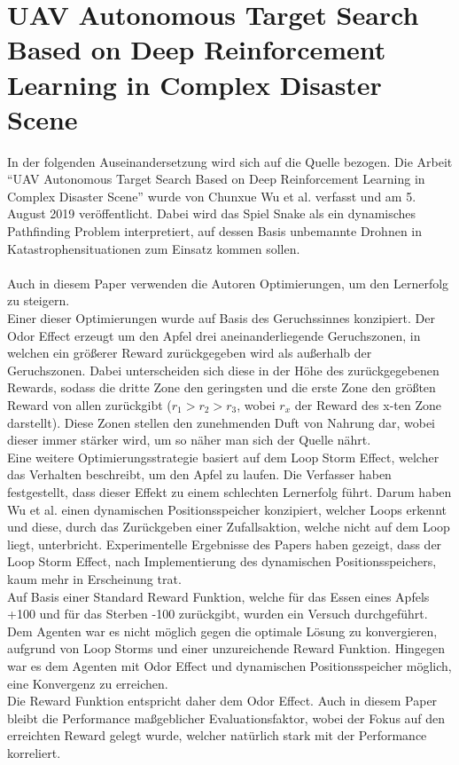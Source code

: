 \section{UAV Autonomous Target Search Based on Deep Reinforcement Learning in Complex Disaster Scene} \label{sec:Verwandte_Arbeiten_Paper_2}
In der folgenden Auseinandersetzung wird sich auf die Quelle \cite{UAV} bezogen.
Die Arbeit "`UAV Autonomous Target Search Based on Deep Reinforcement Learning in Complex Disaster Scene"' wurde von Chunxue Wu et al. verfasst und am 5. August 2019 veröffentlicht. Dabei wird das Spiel Snake als ein dynamisches Pathfinding Problem interpretiert, auf dessen Basis unbemannte Drohnen in Katastrophensituationen zum Einsatz kommen sollen.\\
\\Auch in diesem Paper verwenden die Autoren Optimierungen, um den Lernerfolg zu steigern.\\
Einer dieser Optimierungen wurde auf Basis des Geruchssinnes konzipiert. Der Odor Effect erzeugt um den Apfel drei aneinanderliegende Geruchszonen, in welchen ein größerer Reward zurückgegeben wird als außerhalb der Geruchszonen. Dabei unterscheiden sich diese in der Höhe des zurückgegebenen Rewards, sodass die dritte Zone den geringsten und die erste Zone den größten Reward von allen zurückgibt ($r_1 > r_2 > r_3$, wobei $r_x$ der Reward des x-ten Zone darstellt).
Diese Zonen stellen den zunehmenden Duft von Nahrung dar, wobei dieser immer stärker wird, um so näher man sich der Quelle nährt.\\
Eine weitere Optimierungsstrategie basiert auf dem Loop Storm Effect, welcher das Verhalten beschreibt, um den Apfel zu laufen. Die Verfasser haben festgestellt, dass dieser Effekt zu einem schlechten Lernerfolg führt. Darum haben Wu et al. einen dynamischen Positionsspeicher konzipiert, welcher Loops erkennt und diese, durch das Zurückgeben einer Zufallsaktion, welche nicht auf dem Loop liegt, unterbricht. Experimentelle Ergebnisse des Papers haben gezeigt, dass der Loop Storm Effect, nach Implementierung des dynamischen Positionsspeichers, kaum mehr in Erscheinung trat.\\
Auf Basis einer Standard Reward Funktion, welche für das Essen eines Apfels +100 und für das Sterben -100 zurückgibt, wurden ein Versuch durchgeführt. Dem Agenten war es nicht möglich gegen die optimale Lösung zu konvergieren, aufgrund von Loop Storms und einer unzureichende Reward Funktion. Hingegen war es dem Agenten mit Odor Effect und dynamischen Positionsspeicher möglich, eine Konvergenz zu erreichen.\\
Die Reward Funktion entspricht daher dem Odor Effect.
Auch in diesem Paper bleibt die Performance maßgeblicher Evaluationsfaktor, wobei der Fokus auf den erreichten Reward gelegt wurde, welcher natürlich stark mit der Performance korreliert.


